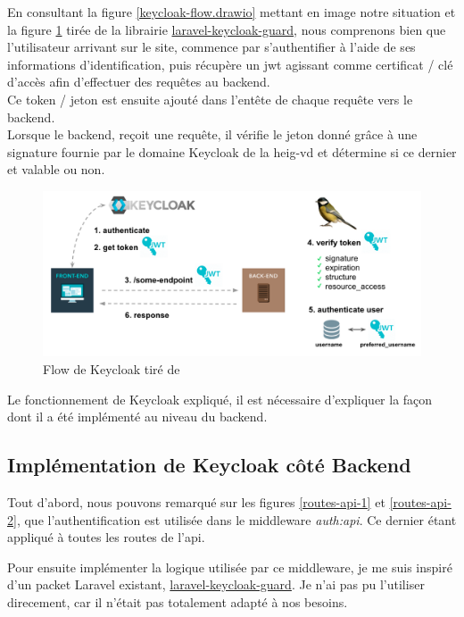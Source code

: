 \documentclass[
    iai, %
    il, %
]{heig-tb}
\begin{document}
En consultant la figure \ref{keycloak-flow.drawio} mettant en image notre situation et la figure \ref{keycloak-flow-lib} tirée de la librairie \href{https://github.com/robsontenorio/laravel-keycloak-guard}{laravel-keycloak-guard}, nous comprenons bien que l'utilisateur arrivant sur le site, commence par s'authentifier à l'aide de ses informations d'identification, puis récupère un \Gls{jwt} agissant comme certificat / clé d'accès afin d'effectuer des requêtes au \Gls{backend}. \\
Ce token / jeton est ensuite ajouté dans l'entête de chaque requête vers le \Gls{backend}. \\
Lorsque le \Gls{backend}, reçoit une requête, il vérifie le jeton donné grâce à une signature fournie par le domaine Keycloak de la \Gls{heig-vd} et détermine si ce dernier et valable ou non.

\begin{center}
    \begin{figure}[H]
        \includegraphics[width=\textwidth]{./assets/figures/keycloak-flow-lib.png}
        \caption{Flow de Keycloak tiré de \label{keycloak-flow-lib}}
    \end{figure}
\end{center}

Le fonctionnement de Keycloak expliqué, il est nécessaire d'expliquer la façon dont il a été implémenté au niveau du \Gls{backend}.

\subsection{Implémentation de Keycloak côté Backend}
Tout d'abord, nous pouvons remarqué sur les figures \ref{routes-api-1} et \ref{routes-api-2}, que l'authentification est utilisée dans le middleware \emph{auth:api}. Ce dernier étant appliqué à toutes les routes de l'\Gls{api}.

Pour ensuite implémenter la logique utilisée par ce middleware, je me suis inspiré d'un packet Laravel existant, \href{https://github.com/robsontenorio/laravel-keycloak-guard}{laravel-keycloak-guard}. Je n'ai pas pu l'utiliser direcement, car il n'était pas totalement adapté à nos besoins.
\end{document}
